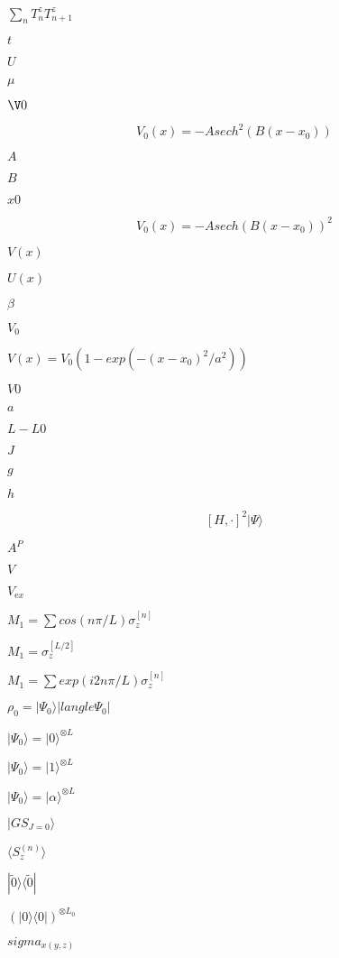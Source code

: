 \documentclass{article}
\begin{document}
$\sum_n T_{n}^{z}T_{n+1}^{z}$
\pagebreak

$t$
\pagebreak

$U$
\pagebreak

$\mu$
\pagebreak

$\V0$
\pagebreak

\[V_0(x)=-A sech^2(B(x-x_0))\]
\pagebreak

$A$
\pagebreak

$B$
\pagebreak

$x0$
\pagebreak

\[V_0(x)=-A sech(B(x-x_0))^2\]
\pagebreak

$V(x)$
\pagebreak

$U(x)$
\pagebreak

$\beta$
\pagebreak

$V_0$
\pagebreak

$V(x)=V_0 (1-exp(-(x-x_0)^2/a^2)) $
\pagebreak

$V0$
\pagebreak

$a$
\pagebreak

$L-L0$
\pagebreak

$J$
\pagebreak

$g$
\pagebreak

$h$
\pagebreak

\[[H,\cdot]^2 |\Psi\rangle\]
\pagebreak

$A^P$
\pagebreak

$V$
\pagebreak

$V_{\mathrm ex}$
\pagebreak

$M_1=\sum cos(n \pi/L) \sigma_z^{[n]}$
\pagebreak

$M_1=\sigma_z^{[L/2]}$
\pagebreak

$M_1=\sum exp(i 2 n \pi/L) \sigma_z^{[n]}$
\pagebreak

$\rho_0=|\Psi_0 \rangle|langle \Psi_0 |$
\pagebreak

$|\Psi_0\rangle=|0\rangle^{\otimes L}$
\pagebreak

$|\Psi_0\rangle=|1\rangle^{\otimes L}$
\pagebreak

$|\Psi_0\rangle=|\alpha\rangle^{\otimes L}$
\pagebreak

$|GS_{J=0}\rangle$
\pagebreak

$\langle S_z^{(n)}\rangle$
\pagebreak

$| \tilde{0} \rangle \langle \tilde{0}|$
\pagebreak

$\left ( | 0 \rangle \langle 0| \right )^{\otimes L_0}$
\pagebreak

$sigma_{x(y,z)}$
\pagebreak
\end{document}
